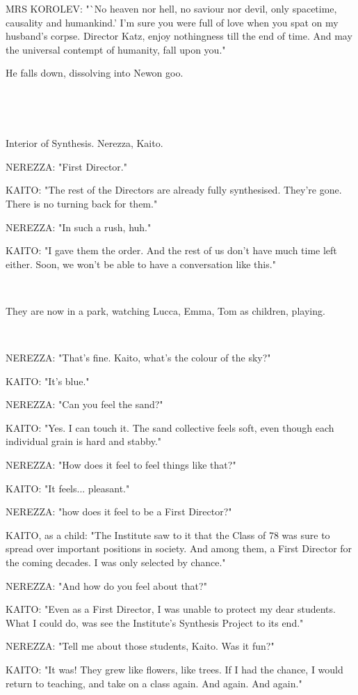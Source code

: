 \documentclass[11pt]{article}
\begin{document}
MRS KOROLEV: "`No heaven nor hell, no saviour nor devil, only spacetime, causality and humankind.'
I'm sure you were full of love when you spat on my husband's corpse.
Director Katz, enjoy nothingness till the end of time.
And may the universal contempt of humanity, fall upon you."

He falls down, dissolving into Newon goo.

\ 

\ 

Interior of Synthesis.
Nerezza, Kaito. 

NEREZZA: "First Director."

KAITO: "The rest of the Directors are already fully synthesised. 
They're gone.
There is no turning back for them."

NEREZZA: "In such a rush, huh."

KAITO: "I gave them the order.
And the rest of us don't have much time left either.
Soon, we won't be able to have a conversation like this."

\ 

They are now in a park, watching Lucca, Emma, Tom as children, playing.

\ 

NEREZZA: "That's fine.
Kaito, what's the colour of the sky?"

KAITO: "It's blue."

NEREZZA: "Can you feel the sand?"

KAITO: "Yes. I can touch it.
The sand collective feels soft, even though each individual grain is hard and stabby."

NEREZZA: "How does it feel to feel things like that?"

KAITO: "It feels... pleasant."

NEREZZA: "how does it feel to be a First Director?"

KAITO, as a child: "The Institute saw to it that the Class of 78 was sure to spread over important positions in society. 
And among them, a First Director for the coming decades.
I was only selected by chance."

NEREZZA: "And how do you feel about that?"

KAITO: "Even as a First Director, I was unable to protect my dear students.
What I could do, was see the Institute's Synthesis Project to its end."

NEREZZA: "Tell me about those students, Kaito. Was it fun?"

KAITO: "It was! They grew like flowers, like trees.
If I had the chance, I would return to teaching, and take on a class again.
And again.
And again."
\end{document}
